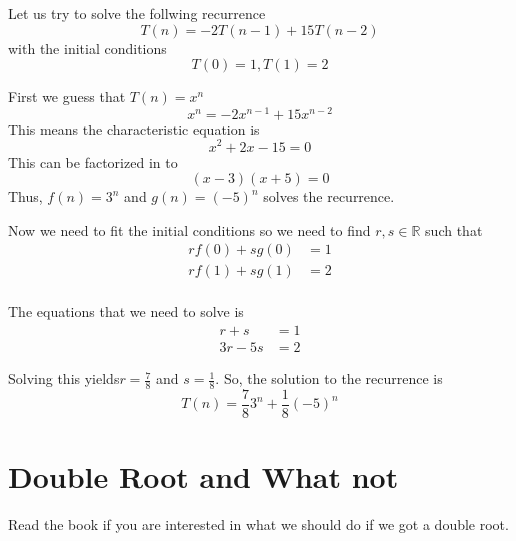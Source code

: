 \documentclass[a4paper, 12pt]{article}
\newcommand{\real}{\mathbb{R}}
\begin{document}
\begin{multicols}{2}
Let us try to solve the follwing recurrence
\[
	T(n) = -2 T(n-1) + 15 T(n-2)
\]
with the initial conditions
\[
T(0) = 1, T(1)=2
\]

First we guess that $T(n) = x^n$
\[
	x^n = -2x^{n-1} + 15 x^{n-2}
\]
This means the characteristic equation is
\[
	x^2 + 2x -15 = 0
\]
This can be factorized in to
\[
	(x-3)(x+5) = 0
\]
Thus, $f(n)=3^n$ and $g(n)=(-5)^n$ solves the recurrence.

Now we need to fit the initial conditions so we need to find $r,s \in \real$ such that
\begin{align*}
	r f(0) + s g(0) &= 1\\
	r f(1) + s g(1) &= 2\\
\end{align*}

The equations that we need to solve is
\begin{align*}
	r + s &= 1\\
	3r -5s &= 2
\end{align*}

Solving this yields$\displaystyle r = \frac{7}{8}$ and $\displaystyle s = \frac{1}{8}$. So, the solution to the recurrence is
\[
	T(n) = \frac{7}{8}3^n +\frac{1}{8}(-5)^n
\]

\section*{Double Root and What not}
Read the book if you are interested in what we should do if we got a double root.

%
%
%
%
%
%




\end{multicols}
\end{document}
